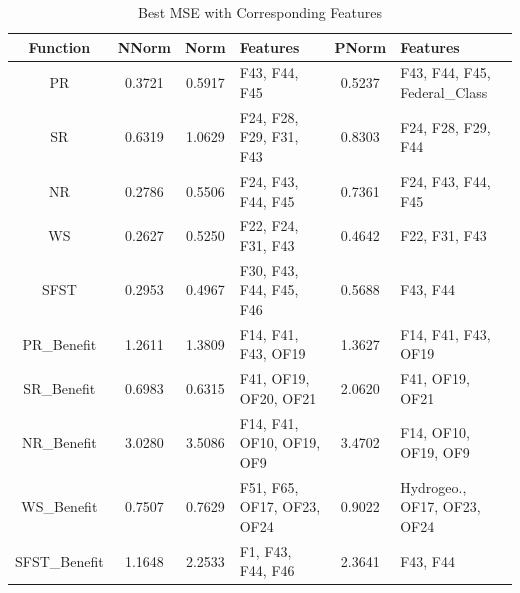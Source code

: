 \documentclass[12pt,letterpaper]{article}
\begin{document}
\begin{table}[H]
\centering
\begin{tabular}{|c|c|c|p{4cm}|c|p{4cm}|}
\hline
\textbf{Function} & \textbf{NNorm} & \textbf{Norm} & \textbf{Features} & \textbf{PNorm} & \textbf{Features} \\
\hline
PR & 0.3721 & 0.5917 & F43, F44, F45 & 0.5237 & F43, F44, F45, Federal\_Class \\
\hline
SR & 0.6319 & 1.0629 & F24, F28, F29, F31, F43 & 0.8303 & F24, F28, F29, F44 \\
\hline
NR & 0.2786 & 0.5506 & F24, F43, F44, F45 & 0.7361 & F24, F43, F44, F45 \\
\hline
WS & 0.2627 & 0.5250 & F22, F24, F31, F43 & 0.4642 & F22, F31, F43 \\
\hline
SFST & 0.2953 & 0.4967 & F30, F43, F44, F45, F46 & 0.5688 & F43, F44\\
\hline
\hline
PR\_Benefit & 1.2611 & 1.3809 & F14, F41, F43, OF19 & 1.3627 & F14, F41, F43, OF19 \\
\hline
SR\_Benefit & 0.6983 & 0.6315 & F41, OF19, OF20, OF21 & 2.0620 & F41, OF19, OF21 \\
\hline
NR\_Benefit & 3.0280 & 3.5086 & F14, F41, OF10, OF19, OF9 & 3.4702 & F14, OF10, OF19, OF9 \\
\hline
WS\_Benefit & 0.7507 & 0.7629 & F51, F65, OF17, OF23, OF24 & 0.9022 &  Hydrogeo., OF17, OF23, OF24 \\
\hline
SFST\_Benefit & 1.1648 & 2.2533 & F1, F43, F44, F46 & 2.3641 & F43, F44 \\
\hline
\end{tabular}
\caption{Best MSE with Corresponding Features}
\label{reg_all_tab:featred_res}
\end{table}
\end{document}
